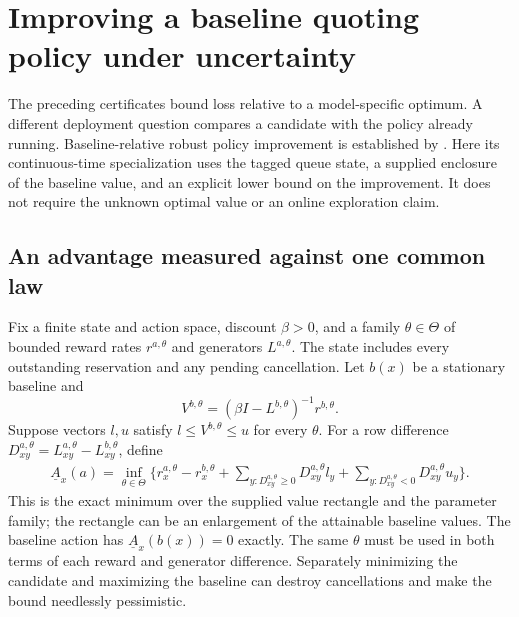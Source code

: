 \section{Improving a baseline quoting policy under uncertainty}
\label{sec:baselinequoting}

The preceding certificates bound loss relative to a model-specific optimum.
A different deployment question compares a candidate with the policy already
running. Baseline-relative robust policy improvement is established by
\citet{GhavamzadehPetrikChow2016}. Here its continuous-time specialization
uses the tagged queue state, a supplied enclosure of the baseline value,
and an explicit lower bound on the improvement. It does not require the
unknown optimal value or an online exploration claim.

\subsection{An advantage measured against one common law}

Fix a finite state and action space, discount $\beta>0$, and a family
$\theta\in\Theta$ of bounded reward rates $r^{a,\theta}$ and generators
$L^{a,\theta}$. The state includes every outstanding reservation and any
pending cancellation. Let $b(x)$ be a stationary baseline and
\[
 V^{b,\theta}=(\beta I-L^{b,\theta})^{-1}r^{b,\theta}.
\]
Suppose vectors $l,u$ satisfy $l\le V^{b,\theta}\le u$ for every $\theta$.
For a row difference $D_{xy}^{a,\theta}=L_{xy}^{a,\theta}-L_{xy}^{b,\theta}$,
define
\begin{align}
 \underline A_x(a)=\inf_{\theta\in\Theta}\bigg\{
 r_x^{a,\theta}-r_x^{b,\theta}
 +\sum_{y:D_{xy}^{a,\theta}\ge0}D_{xy}^{a,\theta}l_y
 +\sum_{y:D_{xy}^{a,\theta}<0}D_{xy}^{a,\theta}u_y\bigg\}.
 \label{eq:baselineadvantage}
\end{align}
This is the exact minimum over the supplied value rectangle and the
parameter family; the rectangle can be an enlargement of the attainable
baseline values. The baseline action has $\underline A_x(b(x))=0$ exactly.
The same $\theta$ must be used in both terms of each reward and generator
difference. Separately minimizing the candidate and maximizing the baseline
can destroy cancellations and make the bound needlessly pessimistic.

